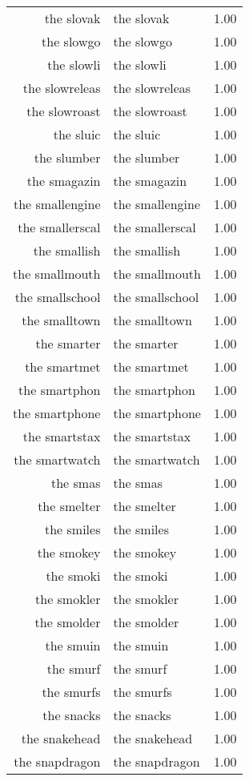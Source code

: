 \begin{table}[ht]
\begin{tabular}{rlr}
  the slovak & the slovak & 1.00 \\ 
  the slowgo & the slowgo & 1.00 \\ 
  the slowli & the slowli & 1.00 \\ 
  the slowreleas & the slowreleas & 1.00 \\ 
  the slowroast & the slowroast & 1.00 \\ 
  the sluic & the sluic & 1.00 \\ 
  the slumber & the slumber & 1.00 \\ 
  the smagazin & the smagazin & 1.00 \\ 
  the smallengine & the smallengine & 1.00 \\ 
  the smallerscal & the smallerscal & 1.00 \\ 
  the smallish & the smallish & 1.00 \\ 
  the smallmouth & the smallmouth & 1.00 \\ 
  the smallschool & the smallschool & 1.00 \\ 
  the smalltown & the smalltown & 1.00 \\ 
  the smarter & the smarter & 1.00 \\ 
  the smartmet & the smartmet & 1.00 \\ 
  the smartphon & the smartphon & 1.00 \\ 
  the smartphone & the smartphone & 1.00 \\ 
  the smartstax & the smartstax & 1.00 \\ 
  the smartwatch & the smartwatch & 1.00 \\ 
  the smas & the smas & 1.00 \\ 
  the smelter & the smelter & 1.00 \\ 
  the smiles & the smiles & 1.00 \\ 
  the smokey & the smokey & 1.00 \\ 
  the smoki & the smoki & 1.00 \\ 
  the smokler & the smokler & 1.00 \\ 
  the smolder & the smolder & 1.00 \\ 
  the smuin & the smuin & 1.00 \\ 
  the smurf & the smurf & 1.00 \\ 
  the smurfs & the smurfs & 1.00 \\ 
  the snacks & the snacks & 1.00 \\ 
  the snakehead & the snakehead & 1.00 \\ 
  the snapdragon & the snapdragon & 1.00 \\ 

\end{tabular}
\end{table}
